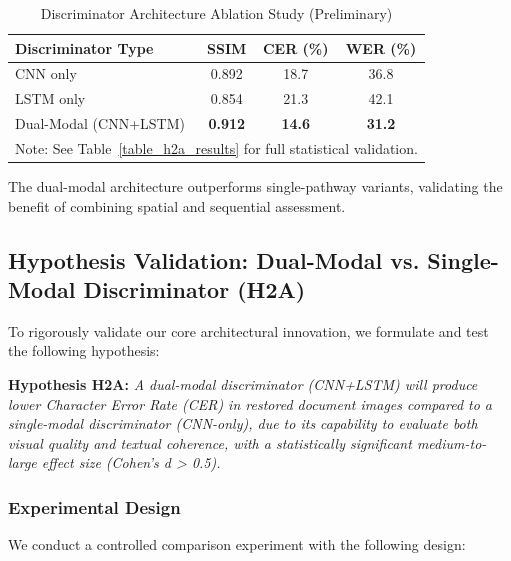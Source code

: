 \documentclass[journal]{IEEEtran}
\begin{document}
\begin{table}[!t]
\renewcommand{\arraystretch}{1.3}
\caption{Discriminator Architecture Ablation Study (Preliminary)}
\label{table_ablation_discriminator}
\centering
\begin{tabular}{|l|c|c|c|}
\hline
\textbf{Discriminator Type} & \textbf{SSIM} & \textbf{CER (\%)} & \textbf{WER (\%)} \\
\hline
CNN only & 0.892 & 18.7 & 36.8 \\
LSTM only & 0.854 & 21.3 & 42.1 \\
Dual-Modal (CNN+LSTM) & \textbf{0.912} & \textbf{14.6} & \textbf{31.2} \\
\hline
\multicolumn{4}{l}{\footnotesize Note: See Table~\ref{table_h2a_results} for full statistical validation.} \\
\end{tabular}
\end{table}

The dual-modal architecture outperforms single-pathway variants, validating the benefit of combining spatial and sequential assessment.

\subsection{Hypothesis Validation: Dual-Modal vs. Single-Modal Discriminator (H2A)}

To rigorously validate our core architectural innovation, we formulate and test the following hypothesis:

\textbf{Hypothesis H2A:} \textit{A dual-modal discriminator (CNN+LSTM) will produce lower Character Error Rate (CER) in restored document images compared to a single-modal discriminator (CNN-only), due to its capability to evaluate both visual quality and textual coherence, with a statistically significant medium-to-large effect size (Cohen's d > 0.5).}

\subsubsection{Experimental Design}

We conduct a controlled comparison experiment with the following design:
\end{document}
